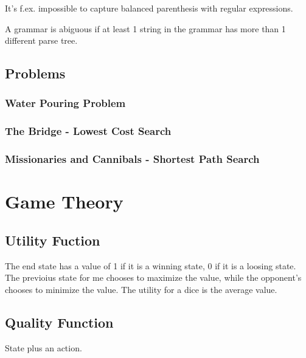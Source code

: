 \documentclass[12pt]{article}
\begin{document}
It's f.ex. impossible to capture balanced parenthesis with regular expressions.

A grammar is abiguous if at least 1 string in the grammar has more than 1 different parse tree.



\subsection{Problems}


\subsubsection{Water Pouring Problem}




\subsubsection{The Bridge - Lowest Cost Search}




\subsubsection{Missionaries and Cannibals - Shortest Path Search}





\section{Game Theory}

\subsection{Utility Fuction}

The end state has a value of 1 if it is a winning state, 0 if it is a loosing state. The previoius state for me chooses to maximize the value, while the opponent's chooses to minimize the value. The utility for a dice is the average value.

\subsection{Quality Function}

State plus an action.
\end{document}
